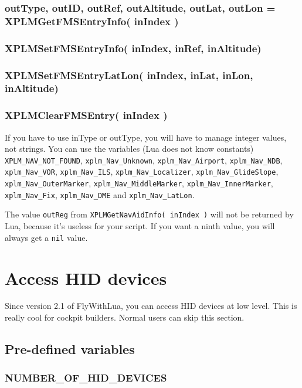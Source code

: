 \documentclass[11pt,parskip=half,a4paper]{scrartcl}
\begin{document}
\subsubsection{outType, outID, outRef, outAltitude, outLat, outLon = XPLMGetFMSEntryInfo( inIndex )}

\newpage

\subsubsection{XPLMSetFMSEntryInfo( inIndex, inRef, inAltitude)}

\subsubsection{XPLMSetFMSEntryLatLon( inIndex, inLat, inLon, inAltitude)}

\subsubsection{XPLMClearFMSEntry( inIndex )}

If you have to use inType or outType, you will have to manage integer values, not strings. You can use the variables (Lua does not know constants) \verb|XPLM_NAV_NOT_FOUND|, \verb|xplm_Nav_Unknown|, \verb|xplm_Nav_Airport|, \verb|xplm_Nav_NDB|, \verb|xplm_Nav_VOR|, \verb|xplm_Nav_ILS|, \verb|xplm_Nav_Localizer|, \verb|xplm_Nav_GlideSlope|, \verb|xplm_Nav_OuterMarker|, \verb|xplm_Nav_MiddleMarker|, \verb|xplm_Nav_InnerMarker|, \verb|xplm_Nav_Fix|, \verb|xplm_Nav_DME| and \verb|xplm_Nav_LatLon|.

The value \verb|outReg| from \verb|XPLMGetNavAidInfo( inIndex )| will not be returned by Lua, because it's useless for your script. If you want a ninth value, you will always get a \verb|nil| value.

\newpage
\section{Access HID devices}

Since version 2.1 of FlyWithLua, you can access HID devices at low level. This is really cool for cockpit builders. Normal users can skip this section.

\subsection{Pre-defined variables}

\subsubsection{NUMBER\_OF\_HID\_DEVICES}
\end{document}
